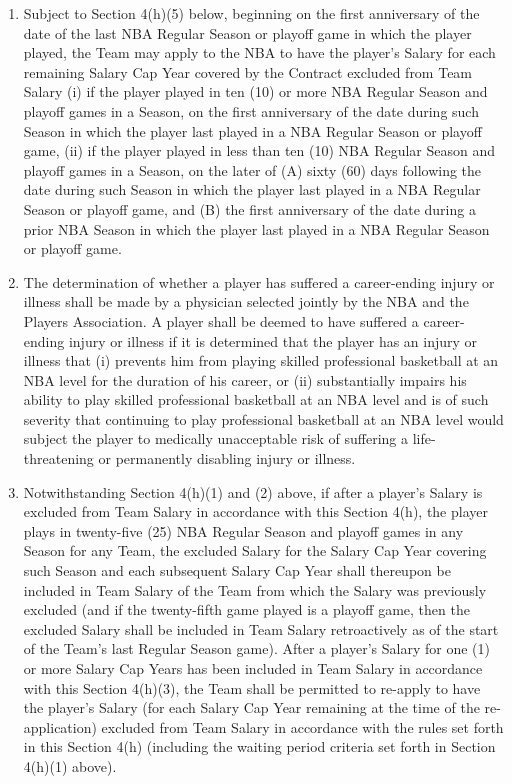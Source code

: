 \documentclass[
]{book}
\providecommand{\tightlist}{%
  \setlength{\itemsep}{0pt}\setlength{\parskip}{0pt}}
\begin{document}
\begin{enumerate}
  \begin{enumerate}
  \def\labelenumii{(\arabic{enumii})}
  \tightlist
  \item
    Subject to Section 4(h)(5) below, beginning on the first anniversary of the date of the last NBA Regular Season or playoff game in which the player played, the Team may apply to the NBA to have the player's Salary for each remaining Salary Cap Year covered by the Contract excluded from Team Salary (i) if the player played in ten (10) or more NBA Regular Season and playoff games in a Season, on the first anniversary of the date during such Season in which the player last played in a NBA Regular Season or playoff game, (ii) if the player played in less than ten (10) NBA Regular Season and playoff games in a Season, on the later of (A) sixty (60) days following the date during such Season in which the player last played in a NBA Regular Season or playoff game, and (B) the first anniversary of the date during a prior NBA Season in which the player last played in a NBA Regular Season or playoff game.
  \item
    The determination of whether a player has suffered a career-ending injury or illness shall be made by a physician selected jointly by the NBA and the Players Association. A player shall be deemed to have suffered a career-ending injury or illness if it is determined that the player has an injury or illness that (i) prevents him from playing skilled professional basketball at an NBA level for the duration of his career, or (ii) substantially impairs his ability to play skilled professional basketball at an NBA level and is of such severity that continuing to play professional basketball at an NBA level would subject the player to medically unacceptable risk of suffering a life-threatening or permanently disabling injury or illness.
  \item
    Notwithstanding Section 4(h)(1) and (2) above, if after a player's Salary is excluded from Team Salary in accordance with this Section 4(h), the player plays in twenty-five (25) NBA Regular Season and playoff games in any Season for any Team, the excluded Salary for the Salary Cap Year covering such Season and each subsequent Salary Cap Year shall thereupon be included in Team Salary of the Team from which the Salary was previously excluded (and if the twenty-fifth game played is a playoff game, then the excluded Salary shall be included in Team Salary retroactively as of the start of the Team's last Regular Season game). After a player's Salary for one (1) or more Salary Cap Years has been included in Team Salary in accordance with this Section 4(h)(3), the Team shall be permitted to re-apply to have the player's Salary (for each Salary Cap Year remaining at the time of the re-application) excluded from Team Salary in accordance with the rules set forth in this Section 4(h) (including the waiting period criteria set forth in Section 4(h)(1) above).

\end{enumerate}
\end{enumerate}
\end{document}
